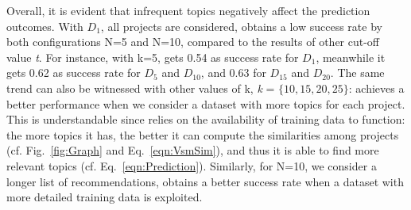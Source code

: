 
Overall, it is evident that infrequent topics negatively affect the prediction outcomes. With $D_{1}$, \ie all projects are considered, \TF obtains a low success rate by both configurations N=5 and N=10, compared to the results of other cut-off value \emph{t}. For instance, with k=5, \TFa gets 0.54 as success rate for $D_{1}$, meanwhile it gets 0.62 as success rate for $D_{5}$ and $D_{10}$, and 0.63 for $D_{15}$ and $D_{20}$. The same trend can also be witnessed with other values of k, \ie \emph{k} = $\{10, 15, 20, 25\}$: \TFa achieves a better performance when we consider a dataset with more topics for each project. This is understandable since \TFa relies on the availability of training data to function: the more topics it has, the better it can compute the similarities among projects (cf. Fig.~\ref{fig:Graph} and Eq.~\ref{eqn:VsmSim}), and thus it is able to find more relevant topics (cf. Eq.~\ref{eqn:Prediction}). Similarly, for N=10, \ie we consider a longer list of recommendations, \TFa obtains a better success rate when a dataset with more detailed training data is exploited. 

